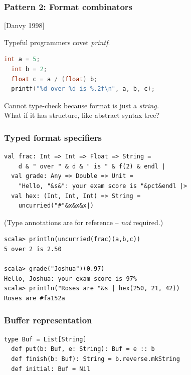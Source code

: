 \documentclass[14pt,t,usepdftitle=false,
xcolornames=x11names,svgnames,dvipsnames]{beamer}
\begin{document}

\begin{frame}[fragile]
  \frametitle{Pattern 2: Format combinators}
  \hfill[Danvy 1998]

  Typeful programmers covet \textit{printf}.
\begin{lstlisting}[language=C]
  int a = 5;
  int b = 2;
  float c = a / (float) b;
  printf("%d over %d is %.2f\n", a, b, c);
\end{lstlisting}
  Cannot type-check because format is just a \emph{string.}\\
  What if it has structure, like abstract syntax tree?
\end{frame}

\begin{frame}[fragile]
  \frametitle{Typed format specifiers}
\begin{lstlisting}[style=scala]
  val frac: Int => Int => Float => String =
    d & " over " & d & " is " & f(2) & endl |
  val grade: Any => Double => Unit =
    "Hello, "&s&": your exam score is "&pct&endl |>
  val hex: (Int, Int, Int) => String =
    uncurried("#"&x&x&x|)
\end{lstlisting}
  {\vskip-3mm\footnotesize\hfill(Type annotations are for reference --
    \emph{not} required.)}
\begin{lstlisting}[style=scalarepl]
scala> println(uncurried(frac)(a,b,c))
5 over 2 is 2.50

scala> grade("Joshua")(0.97)
Hello, Joshua: your exam score is 97%
scala> println("Roses are "&s | hex(250, 21, 42))
Roses are #fa152a
\end{lstlisting}
\end{frame}

\begin{frame}[fragile]
  \frametitle{Buffer representation}
\begin{lstlisting}[style=scala,moreemph={Buf}]
  type Buf = List[String]
  def put(b: Buf, e: String): Buf = e :: b
  def finish(b: Buf): String = b.reverse.mkString
  def initial: Buf = Nil
\end{lstlisting}
\end{frame}
\end{document}
